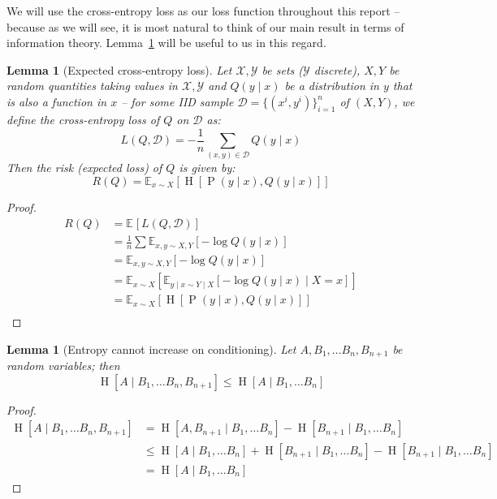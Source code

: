 \documentclass[12pt]{article}
\newcommand{\Ent}[1]{\operatorname{H}\left[#1\right]}
\newcommand{\E}[2][{}]{\mathbb{E}_{#1}\left[#2\right]}
\newcommand{\Prob}[1]{\operatorname{P}\left(#1\right)}
\newtheorem{lem}[thm]{Lemma}
\theoremstyle{definition}
\numberwithin{equation}{section}
\numberwithin{figure}{section}
\numberwithin{table}{section}
\begin{document}
We will use the cross-entropy loss as our loss function throughout this report -- because as we will see, it is most natural to think of our main result in terms of information theory. Lemma~\ref{lem:entropy} will be useful to us in this regard.

\begin{lem}[Expected cross-entropy loss]
    \label{lem:entropy}
    Let $\mathcal{X},\mathcal{Y}$ be sets ($\mathcal{Y}$ discrete), $X, Y$ be random quantities taking values in $\mathcal{X},\mathcal{Y}$ and $Q(y\mid x)$ be a distribution in $y$ that is also a function in $x$ -- for some IID sample $\mathcal{D}=\{(x^i,y^i)\}_{i=1}^n$ of $(X, Y)$, we define the cross-entropy loss of $Q$ on $\mathcal{D}$ as:
    \begin{equation*}
        L(Q,\mathcal{D}) = -\frac1n \sum_{(x, y)\in\mathcal{D}}{Q(y\mid x)}
    \end{equation*}
    Then the risk (expected loss) of $Q$ is given by:
    \begin{equation*}
        R(Q) = \E[x\sim X]{\Ent{\Prob{y\mid x}, Q(y\mid x)}}
    \end{equation*}
\end{lem}
\begin{proof}
    \begin{align*}
        R(Q) &= \E{L(Q,\mathcal{D})} \\
        &= \frac1n \sum{\E[x,y\sim X,Y]{-\log Q(y\mid x)}} \\
        &= {\E[x,y\sim X,Y]{-\log Q(y\mid x)}}\\
        &= {\E[x\sim X]{\E[y\mid x\sim Y\mid X]{-\log Q(y\mid x)\mid X=x}}} \\
        &= \E[x\sim X]{\Ent{\Prob{y\mid x},Q(y\mid x)}} \\
    \end{align*}
\end{proof}

\begin{lem}[Entropy cannot increase on conditioning]
    \label{lem:condition}
    Let $A,B_1,\dots B_n, B_{n+1}$ be random variables; then
    \begin{equation*}
        \Ent{A\mid B_1, \dots B_n, B_{n+1}} \le \Ent{A\mid B_1, \dots B_n}
    \end{equation*}
\end{lem}
\begin{proof}
    \begin{align*}
        \Ent{A\mid B_1, \dots B_n, B_{n+1}} &= \Ent{A, B_{n+1}\mid B_1, \dots B_n} - \Ent{B_{n+1}\mid B_1, \dots B_n} \\ 
        &\le \Ent{A \mid B_1, \dots B_n} + \Ent{B_{n+1} \mid B_1, \dots B_n} - \Ent{B_{n+1}\mid B_1, \dots B_n} \\
        &= \Ent{A \mid B_1, \dots B_n}
    \end{align*}
\end{proof}
\end{document}
